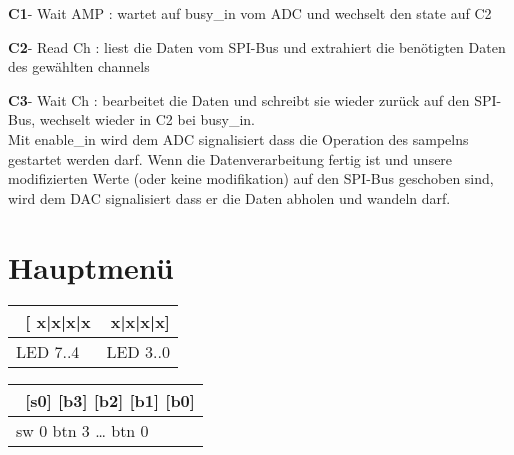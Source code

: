 \textbf{C1}- Wait AMP : wartet auf busy\_in vom ADC und wechselt den state auf C2

\textbf{C2}- Read Ch : liest die Daten vom SPI-Bus und extrahiert die benötigten Daten des gewählten channels

\textbf{C3}- Wait Ch : bearbeitet die Daten und schreibt sie wieder zurück auf den SPI-Bus, wechselt wieder in C2 bei busy\_in.\\

Mit enable\_in wird dem ADC signalisiert dass die Operation des sampelns gestartet werden darf.
Wenn die Datenverarbeitung fertig ist und unsere modifizierten Werte (oder keine modifikation) auf den SPI-Bus geschoben sind,  wird dem DAC signalisiert dass er die Daten abholen und wandeln darf.

\section{Hauptmenü}

\begin{table}[H]
	\centering
	\begin{tabular}{|l|r|}
		\hline
		\ [{\color{red} x}{\color{blue}|x|x|x} &{\color{orange} x|x|x|x}]	\\
		\hline
		LED 7..4 & LED 3..0\\
		\hline
	\end{tabular}
\end{table}

\begin{table}[H]
	\centering
	\begin{tabular}{|l|}
		\hline
		\ [s0] [b3] [b2] [b1] [b0]	\\
		\hline
		sw 0 btn 3    …    btn 0\\
		\hline
	\end{tabular}
\end{table}

